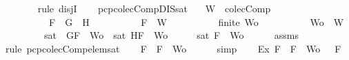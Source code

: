 \begin{isabellebody}
\ \ \ \ \ \ \isamarkupfalse%
\ {\isacharparenleft}rule\ disjI{}{\isacharparenright}\isanewline
\ \ \isamarkupfalse%
\isanewline
{}\isamarkupfalse%
%
\endisatagproof
{\isafoldproof}%
%
\isadelimproof
\isanewline
%
\endisadelimproof
\isanewline
{}\isamarkupfalse%
\ pcp{\isacharunderscore}colecComp{\isacharunderscore}DIS{\isacharunderscore}sat{}{\isacharcolon}\isanewline
\ \ \ {\isachardoublequoteopen}W\ {\isasymin}\ colecComp{\isachardoublequoteclose}\isanewline
\ \ \ \ \ \ \ \ \ \ {\isachardoublequoteopen}F\ {\isacharequal}\ G\ \isactrlbold {\isasymrightarrow}\ H{\isachardoublequoteclose}\isanewline
\ \ \ \ \ \ \ \ \ \ {\isachardoublequoteopen}F\ {\isasymin}\ W{\isachardoublequoteclose}\isanewline
\ \ \ \ \ \ \ \ \ \ {\isachardoublequoteopen}finite\ Wo{\isachardoublequoteclose}\isanewline
\ \ \ \ \ \ \ \ \ \ {\isachardoublequoteopen}Wo\ {\isasymsubseteq}\ W{\isachardoublequoteclose}\isanewline
\ \ \ \ \ \ \ \ \ {\isachardoublequoteopen}sat\ {\isacharparenleft}{\isacharbraceleft}\isactrlbold {\isasymnot}\ G{\isacharcomma}F{\isacharbraceright}\ {\isasymunion}\ Wo{\isacharparenright}\ {\isasymor}\ sat\ {\isacharparenleft}{\isacharbraceleft}H{\isacharcomma}F{\isacharbraceright}\ {\isasymunion}\ Wo{\isacharparenright}{\isachardoublequoteclose}\isanewline
%
\isadelimproof
%
\endisadelimproof
%
\isatagproof
{}\isamarkupfalse%
\ {\isacharminus}\isanewline
\ \ \isamarkupfalse%
\ {\isachardoublequoteopen}sat\ {\isacharparenleft}{\isacharbraceleft}F{\isacharbraceright}\ {\isasymunion}\ Wo{\isacharparenright}{\isachardoublequoteclose}\isanewline
\ \ \ \ \isamarkupfalse%
\ assms{\isacharparenleft}{}{\isacharcomma}{}{\isacharcomma}{}{\isacharcomma}{}{\isacharparenright}\ \isamarkupfalse%
\ {\isacharparenleft}rule\ pcp{\isacharunderscore}colecComp{\isacharunderscore}elem{\isacharunderscore}sat{\isacharparenright}\isanewline
\ \ \isamarkupfalse%
\ {\isachardoublequoteopen}F\ {\isasymin}\ {\isacharbraceleft}F{\isacharbraceright}\ {\isasymunion}\ Wo{\isachardoublequoteclose}\isanewline
\ \ \ \ \isamarkupfalse%
\ simp\isanewline
\ \ \isamarkupfalse%
\ Ex{}{\isacharcolon}{\isachardoublequoteopen}{\isasymexists}{\isasymA}{\isachardot}\ {\isasymforall}F\ {\isasymin}\ {\isacharparenleft}{\isacharbraceleft}F{\isacharbraceright}\ {\isasymunion}\ Wo{\isacharparenright}{\isachardot}\ {\isasymA}\ {\isasymTurnstile}\ F{\isachardoublequoteclose}\isanewline

\end{isabellebody}
